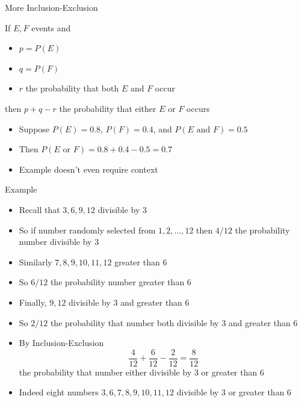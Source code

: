 \documentclass{beamer}
\theoremstyle{definition}
\begin{document}
\begin{frame}{More Inclusion-Exclusion}
\begin{theorem}
If $E,F$ events and
\begin{itemize}
\item $p=P\left(E\right)$
\item $q=P\left(F\right)$
\item $r$ the probability that \alert{both} $E$ and $F$ occur
\end{itemize}
then $p+q-r$ the probability that \alert{either} $E$ or $F$ occurs
\end{theorem}
\begin{example}[Exercise 11]
\begin{itemize}
\item Suppose $P\left(E\right)=0.8$,
$P\left(F\right)=0.4$, and $P\left(\text{$E$ and $F$}\right)=0.5$
\item Then $P\left(\text{$E$ or $F$}\right)
=0.8+0.4-0.5=0.7$
\item Example doesn't even require context
\end{itemize}
\end{example}
\end{frame}

\begin{frame}{Example}
\begin{itemize}
\item Recall that $3,6,9,12$ divisible by $3$
\item So if number randomly selected from
$1,2,\ldots,12$ then $4/12$
the probability number divisible by $3$
\item Similarly $7,8,9,10,11,12$ greater than $6$
\item So $6/12$ the probability number
greater than $6$
\item Finally, $9,12$ divisible by $3$ \alert{and}
greater than $6$
\item So $2/12$ the probability that number
both divisible by $3$ and greater than $6$
\item By Inclusion-Exclusion
\[\frac{4}{12}+\frac{6}{12}-\frac{2}{12}=\frac{8}{12}\]
the probability
that number \alert{either} divisible by $3$ or greater than $6$
\item Indeed eight numbers $3,6,7,8,9,10,11,12$ 
divisible by $3$ or greater than $6$
\end{itemize}
\end{frame}
\end{document}

